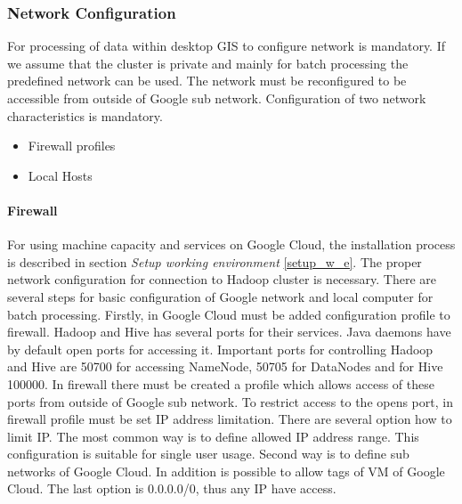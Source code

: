 \documentclass[a4paper,12pt,oneside]{report}
\begin{document}
	\subsubsection{Network Configuration}\label{network_cfg}
	For  processing of data within desktop GIS to configure network is mandatory. 
	If we assume that the cluster is private and mainly for batch processing the 
	predefined network can be used. The network must be reconfigured to be accessible
	from outside of Google sub network. Configuration of two network characteristics is mandatory.
	\begin{itemize}
		\item Firewall profiles
		\item Local Hosts
	\end{itemize}
	
	\paragraph{Firewall} For using machine capacity and services on Google Cloud, 
	the installation process is described in section \textit{Setup working
		environment} \ref{setup_w_e}. The proper network configuration for connection to
	Hadoop cluster is necessary. There are several steps for basic configuration of
	Google network and local computer for batch processing. Firstly, in Google Cloud
	must be added configuration profile to firewall. Hadoop and Hive has several ports
	for their services. Java daemons have by default open ports for accessing it.
	Important ports for controlling Hadoop and Hive are 50700 for accessing NameNode, 50705 for DataNodes
	and for Hive 100000. In firewall there must be created a profile which allows access of
	these ports from outside of Google sub net\-work. To restrict access to the opens port,
	in firewall profile must be set IP address limitation. There are several option
	how to limit IP. The most common way is to define allowed IP address range. This
	configuration is suitable for single user usage. Second way is to define sub
	networks of Google Cloud. In addition is possible to allow tags of VM of Google
	Cloud. The last option is  0.0.0.0/0, thus any IP have access.
	
\end{document}

